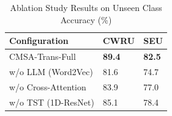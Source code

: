 \begin{table}[htbp]
\centering
\caption{Ablation Study Results on Unseen Class Accuracy (\%)}
\label{tab:ablation}
\begin{tabular}{p{4cm}p{1.8cm}p{1.8cm}}
\toprule
\textbf{Configuration} & \textbf{CWRU} & \textbf{SEU} \\
\midrule
CMSA-Trans-Full & \textbf{89.4} & \textbf{82.5} \\
\midrule
w/o LLM (Word2Vec) & 81.6 & 74.7 \\
\midrule
w/o Cross-Attention & 83.9 & 77.0 \\
\midrule
w/o TST (1D-ResNet) & 85.1 & 78.4 \\
\bottomrule
\end{tabular}
\end{table}
